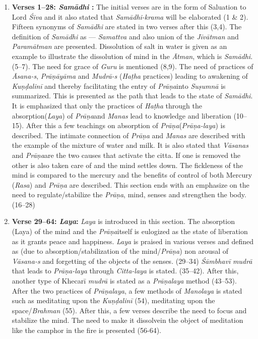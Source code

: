 \begin{enumerate}
\item \textbf{Verses 1--28:  \textit{Samādhi} :} The initial verses are in the form of Saluation to Lord \textit{Śiva} and it also stated that \textit{Samādhi-krama} will be elaborated (1 \& 2). Fifteen synonyms of \textit{Samādhi} are stated in two verses after this (3,4). The definition of \textit{Samādhi} as --- \textit{Samattva} and also union of the \textit{Jīvātman} and \textit{Paramātman} are presented. Dissolution of salt in water is given as an example to illustrate the dissolution of mind in the \textit{Ātman}, which is \textit{Samādhi}.(5--7). The need for grace of \textit{Guru} is mentioned (8,9). The need of practices of \textit{Āsana-s}, \textit{Prāṇāyāma} and \textit{Mudrā-s} (\textit{Haṭha} practices) leading to awakening of \textit{Kuṇḍalinī}  and thereby facilitating the entry of \textit{Prāṇa}into \textit{Suṣumnā} is summarized. This is presented as the path that leads to the state of \textit{Samādhi}. It is emphasized that only the practices of \textit{Haṭha} through the absorption(\textit{Laya}) of \textit{Prāṇa}and \textit{Manas} lead to  knowledge and liberation (10--15). After this a few teachings on absorption of \textit{Prāṇa}(\textit{Prāṇa-laya}) is described. The intimate connection of \textit{Prāṇa} and \textit{Manas} are described with the example of the mixture of water and milk. It is also stated that \textit{Vāsanas} and \textit{Prāṇa}are the two causes that activate the citta. If one is removed the other is also taken care of and the mind settles down. The fickleness of the mind is compared to the mercury and the benefits of control of both Mercury (\textit{Rasa}) and \textit{Prāṇa} are described. This section ends with an emphasize on the need to regulate/stabilize the \textit{Prāṇa}, mind, senses and strengthen the body.(16--28)

\item \textbf{Verse 29--64: \textit{Laya}:} \textit{Laya} is introduced in this section.  The absorption (Laya) of the mind and the \textit{Prāṇa}itself is eulogized as the state of liberation as it grants peace and happiness. \textit{Laya} is praised in various verses and defined as (due to absorption/stabilization of the mind/\textit{Prāṇa}) non arousal of \textit{Vāsana-s} and forgetting of the objects of the senses. (29--34) \textit{Śāmbhavī} \textit{mudrā} that leads to \textit{Prāṇa-laya} through \textit{Citta-laya} is stated. (35--42). After this, another type of Khecarī \textit{mudrā} is stated as a \textit{Prāṇalaya} method (43--53). After the two practices of \textit{Prāṇalaya}, a few methods of \textit{Manolaya} is stated such as meditating upon the \textit{Kuṇḍalinī}  (54), meditating upon the space/\textit{Brahman} (55). After this, a few verses describe the need to focus and stabilize the mind. The need to make it  dissolvein the object of meditation like the camphor in the fire is presented (56-64).


\end{enumerate}
